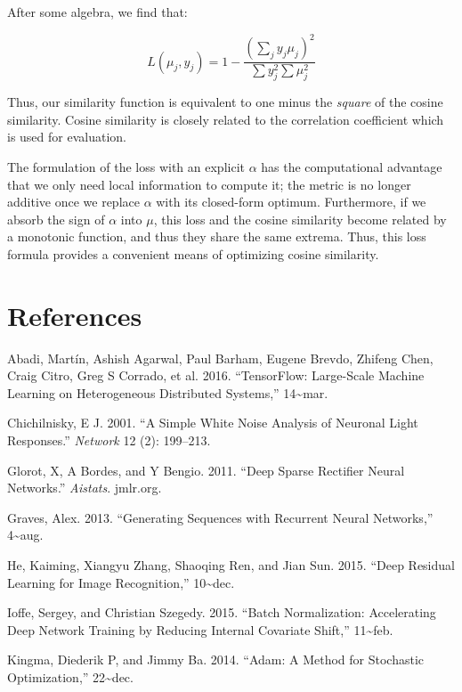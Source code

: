 \documentclass[]{article}
\begin{document}
After some algebra, we find that:

\[
L(\mu_{j}, y_{j}) = 1 - \frac{(\sum_j y_j \mu_j)^2}{\sum y_j^2 \sum \mu_j^2}
\]

Thus, our similarity function is equivalent to one minus the
\emph{square} of the cosine similarity. Cosine similarity is closely
related to the correlation coefficient which is used for evaluation.

The formulation of the loss with an explicit \(\alpha\) has the
computational advantage that we only need local information to compute
it; the metric is no longer additive once we replace \(\alpha\) with its
closed-form optimum. Furthermore, if we absorb the sign of \(\alpha\)
into \(\mu\), this loss and the cosine similarity become related by a
monotonic function, and thus they share the same extrema. Thus, this
loss formula provides a convenient means of optimizing cosine
similarity.

\section*{References}\label{references}

\hypertarget{refs}{}
\hypertarget{ref-Abadi2016-me}{}
Abadi, Martín, Ashish Agarwal, Paul Barham, Eugene Brevdo, Zhifeng Chen,
Craig Citro, Greg S Corrado, et al. 2016. ``TensorFlow: Large-Scale
Machine Learning on Heterogeneous Distributed Systems,''
14\textasciitilde{}mar.

\hypertarget{ref-Chichilnisky2001-wd}{}
Chichilnisky, E J. 2001. ``A Simple White Noise Analysis of Neuronal
Light Responses.'' \emph{Network} 12 (2): 199--213.

\hypertarget{ref-Glorot2011-bj}{}
Glorot, X, A Bordes, and Y Bengio. 2011. ``Deep Sparse Rectifier Neural
Networks.'' \emph{Aistats}. jmlr.org.

\hypertarget{ref-Graves2013-tf}{}
Graves, Alex. 2013. ``Generating Sequences with Recurrent Neural
Networks,'' 4\textasciitilde{}aug.

\hypertarget{ref-He2015-hu}{}
He, Kaiming, Xiangyu Zhang, Shaoqing Ren, and Jian Sun. 2015. ``Deep
Residual Learning for Image Recognition,'' 10\textasciitilde{}dec.

\hypertarget{ref-Ioffe2015-gy}{}
Ioffe, Sergey, and Christian Szegedy. 2015. ``Batch Normalization:
Accelerating Deep Network Training by Reducing Internal Covariate
Shift,'' 11\textasciitilde{}feb.

\hypertarget{ref-Kingma2014-if}{}
Kingma, Diederik P, and Jimmy Ba. 2014. ``Adam: A Method for Stochastic
Optimization,'' 22\textasciitilde{}dec.
\end{document}
